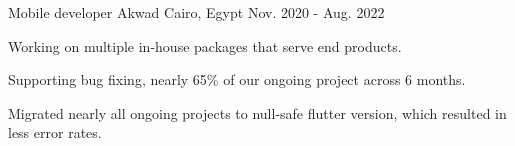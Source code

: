 \begin{cventries}
  \cventry
    {Mobile developer} %
    {Akwad} %
    {Cairo, Egypt} %
    {Nov. 2020 - Aug. 2022} %
    {
      \begin{cvitems} %
        \item {Working on multiple in-house packages that serve end products.}
        \item {Supporting bug fixing, nearly 65\% of our ongoing project across 6 months.}
        \item {Migrated nearly all ongoing projects to null-safe flutter version, which resulted in less error rates.}
      \end{cvitems}
    }

\end{cventries}
